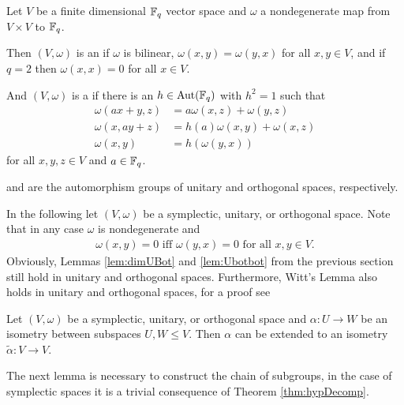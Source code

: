 \begin{definition}
Let $V$ be a finite dimensional $\mathbb{F}_q$ vector space and $\omega$ a nondegenerate map from $V\times V$ to $\mathbb{F}_q$.

Then $(V,\omega)$ is an  if $\omega$ is bilinear, $\omega(x,y)=\omega(y,x)$ for all $x,y\in V$, and if $q=2$ then $\omega(x,x)=0$ for all $x\in V$.

And $(V,\omega)$ is a  if there is an $h\in\operatorname{Aut}(\mathbb{F}_q)$ with $h^2=1$ such that 
\begin{align*}
\omega(ax+y,z)&=a\omega(x,z)+\omega(y,z)\\
\omega(x,ay+z)&=h(a)\omega(x,y)+\omega(x,z)\\
\omega(x,y)&=h(\omega(y,x))
\end{align*}
for all $x,y,z\in V$ and $a\in\mathbb{F}_q$.

 and  are the automorphism groups of unitary and orthogonal spaces, respectively.
\end{definition}

In the following let $(V,\omega)$ be a symplectic, unitary, or orthogonal space.
Note that in any case $\omega$ is nondegenerate and 
\begin{align*}
\omega(x,y)=0 \text{ iff }\omega(y,x)=0\text{ for all $x,y\in V$}.
\end{align*}
Obviously, Lemmas \ref{lem:dimUBot} and \ref{lem:Ubotbot} from the previous section still hold in  unitary and orthogonal spaces. Furthermore, Witt's Lemma also holds in unitary and orthogonal spaces, for a proof see \cite{Witt}
\begin{theorem}\label{thm:Witt}
Let $(V,\omega)$ be a symplectic, unitary, or orthogonal space and $\alpha\colon U\to W$ be an isometry between subspaces $U,W\leq V$.
Then $\alpha$ can be extended to an isometry $\tilde{\alpha}\colon V\to V$.
\end{theorem}

The next lemma is necessary to construct the chain of subgroups, in the case of symplectic spaces it is a trivial consequence of Theorem \ref{thm:hypDecomp}.




